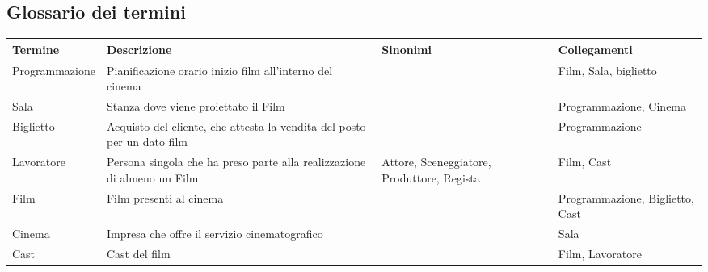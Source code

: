 \documentclass[10pt]{article}
\begin{document}
 	\subsection{Glossario dei termini}
 	\begin{tabular}{ |p{3cm}|p{4.5cm}|p{2.5cm}|p{3cm}|  }
 		\hline
 		\rowcolor{lightgray}
 		\textbf{Termine} & \textbf{Descrizione} & \textbf{Sinonimi} & \textbf{Collegamenti} \\
 		\hline
 		Programmazione                         & Pianificazione orario inizio film all'interno del cinema                &                                                                                      & Film, Sala, biglietto                                                             \\ \hline
 		Sala                                   & Stanza dove viene proiettato il Film                                    &                                                                                      & Programmazione, Cinema \\ \hline
 		Biglietto                              & Acquisto del cliente, che attesta la vendita del posto per un dato film &                                                                                      & Programmazione \\ \hline
 		Lavoratore                                & Persona singola che ha preso parte alla realizzazione di almeno un Film                  & Attore, Sceneggiatore, Produttore, Regista & Film, Cast                                                                        \\ \hline
 		Film                                   & Film presenti al cinema                                                 &                                                                                      & Programmazione, Biglietto, Cast        \\ \hline
 		Cinema                                   &    Impresa che offre il servizio cinematografico &                                                                                      & Sala        \\ \hline
 		Cast                                   &    Cast del film &                                                                                      & Film, Lavoratore        \\ \hline
 	\end{tabular}
\end{document}
